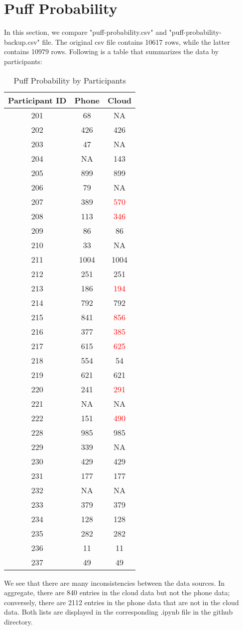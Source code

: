 \documentclass[11pt]{article}
\begin{document}
\section{Puff Probability}
In this section, we compare "puff-probability.csv" and "puff-probability-backup.csv" file. The original csv file contains 10617 rows, while the latter contains 10979 rows. Following is a table that summarizes the data by participants:
\begin{table}[htb]
\centering
\begin{tabular}{|c|c|c|} 
 \hline
Participant ID & Phone & Cloud \\
 \hline
 201 & 68 & NA \\
 \hline
 202 &  426 & 426 \\
 \hline
 203 & 47 & NA \\
 \hline
 204 & NA & 143 \\
\hline  
205 & 899 & 899 \\
\hline
206& 79 & NA \\
\hline
207 & 389 & \textcolor{red}{570} \\
\hline
208 & 113 & \textcolor{red}{346} \\
\hline
209 & 86 &  86 \\
\hline
210 & 33 & NA \\
\hline
211 & 1004 & 1004 \\
\hline
212 & 251 & 251 \\
\hline
213 & 186 & \textcolor{red}{194} \\
\hline
214 & 792 & 792 \\
\hline
215 & 841 & \textcolor{red}{856} \\
\hline
216 & 377 & \textcolor{red}{385} \\
\hline
217 & 615 & \textcolor{red}{625} \\
\hline
218 & 554 & 54 \\
\hline
219 & 621 & 621 \\
\hline
220 & 241 & \textcolor{red}{291} \\
\hline
221 & NA & NA \\
\hline
222 & 151 & \textcolor{red}{490} \\
\hline
228 & 985 & 985 \\
\hline
229 & 339 & NA \\
\hline
230 & 429 & 429 \\
\hline
231 & 177 & 177 \\
\hline
232 & NA & NA \\
\hline
233 & 379 & 379 \\
\hline
234 & 128 & 128 \\
\hline
235 & 282 & 282\\
\hline
236 & 11 & 11\\
\hline
237 & 49 & 49 \\
\hline
\end{tabular}
\caption{Puff Probability  by Participants}
\label{table:2}
\end{table}
We see that there are many inconsistencies between the data sources. In aggregate, there are 840 entries in the cloud data but not the phone data; conversely, there are 2112 entries in the phone data that are not in the cloud data. Both lists are displayed in the corresponding .ipynb file in the github directory. 
\end{document}
